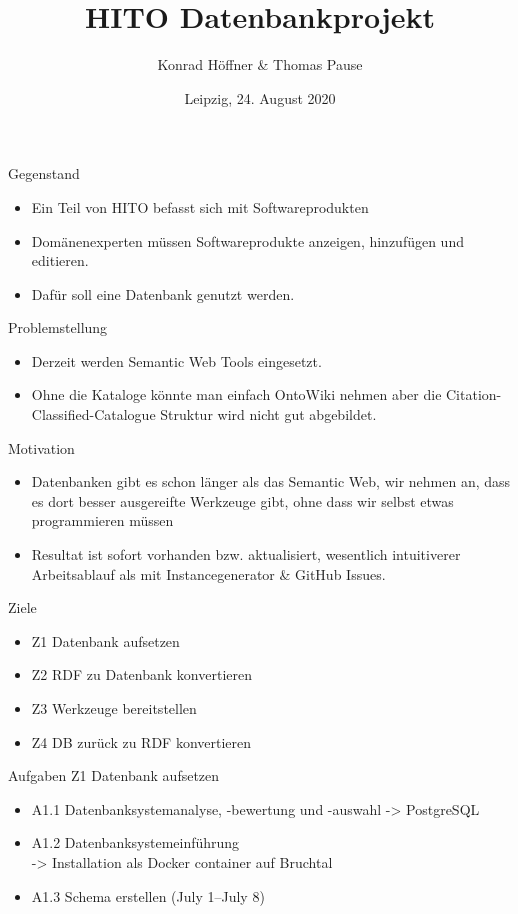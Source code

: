 \documentclass[aspectratio=169]{beamer}
\author{Konrad Höffner \& Thomas Pause}
\date{Leipzig, 24. August 2020}
\title{HITO Datenbankprojekt}
\subtitle{}
\begin{document}
\begin{frame}
\titlepage
\end{frame}

\begin{frame}{Gegenstand}
\begin{itemize}
\item Ein Teil von HITO befasst sich mit Softwareprodukten
\item Domänenexperten müssen Softwareprodukte anzeigen, hinzufügen und editieren.
\item Dafür soll eine Datenbank genutzt werden.
\end{itemize}
\end{frame}

\begin{frame}{Problemstellung}
\begin{itemize}
\item Derzeit werden Semantic Web Tools eingesetzt.
\item Ohne die Kataloge könnte man einfach OntoWiki nehmen aber die Citation-Classified-Catalogue Struktur wird nicht gut abgebildet.
\end{itemize}
\end{frame}

\begin{frame}{Motivation}
\begin{itemize}
\item Datenbanken gibt es schon länger als das Semantic Web, wir nehmen an, dass es dort besser ausgereifte Werkzeuge gibt, ohne dass wir selbst etwas programmieren müssen
\item Resultat ist sofort vorhanden bzw. aktualisiert, wesentlich intuitiverer Arbeitsablauf als mit Instancegenerator \& GitHub Issues.
\end{itemize}
\end{frame}

\begin{frame}{Ziele}
\begin{itemize}
\item Z1 Datenbank aufsetzen \checkmark
\item Z2 RDF zu Datenbank konvertieren
\item Z3 Werkzeuge bereitstellen
\item Z4 DB zurück zu RDF konvertieren
\end{itemize}
\end{frame}

\begin{frame}{Aufgaben Z1 Datenbank aufsetzen}
\begin{itemize}
\item A1.1 Datenbanksystemanalyse, -bewertung und -auswahl -> PostgreSQL \checkmark
\item A1.2 Datenbanksystemeinführung\\-> Installation als Docker container auf Bruchtal \checkmark
\item A1.3 Schema erstellen (July 1--July 8) \checkmark
\end{itemize}
\end{frame}
\end{document}
